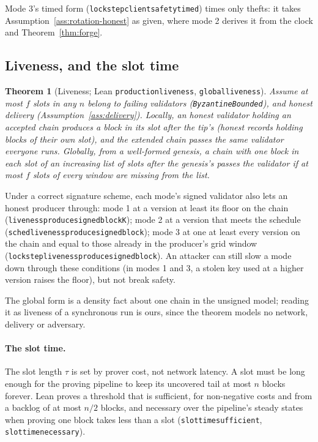 \documentclass[10pt]{article}
\newtheorem{theorem}{Theorem}
\DeclareRobustCommand{\code}[1]{{\renewcommand{\_}{\textunderscore\allowbreak}\texttt{#1}}}
\newcommand{\fmax}{\ensuremath{f}}
\begin{document}
Mode 3's timed form (\code{lockstep\_client\_safety\_timed}) times only
thefts: it takes Assumption~\ref{ass:rotation-honest} as given, where mode 2
derives it from the clock and Theorem~\ref{thm:forge}.

\subsection{Liveness, and the slot time}
\label{sec:liveness}

\begin{theorem}[Liveness; Lean \code{production\_liveness},
\code{global\_liveness}]\label{thm:live}
Assume at most $\fmax$ slots in any $n$ belong to failing validators
(\code{ByzantineBounded}), and honest delivery
(Assumption~\ref{ass:delivery}). Locally, an honest validator holding an
accepted chain produces a block in its slot after the tip's (honest
records holding blocks of their own slot), and the extended chain
passes the same validator everyone runs. Globally, from a well-formed
genesis, a chain with one block in each slot of an increasing list of
slots after the genesis's passes the validator if at most $\fmax$ slots of every window are missing
from the list.
\end{theorem}

Under a correct signature scheme, each mode's signed validator also lets
an honest producer through: mode 1 at a version at least its floor on the chain
(\code{liveness\_produce\_signed\_blockK}); mode 2 at a version that meets
the schedule (\code{sched\_liveness\_produce\_signed\_block}); mode 3 at
one at least every version on the chain and equal to those already in the
producer's grid window (\code{lockstep\_liveness\_produce\_signed\_block}). An attacker
can still slow a mode down through these conditions (in modes 1 and 3,
a stolen key used at a higher version raises the floor), but not break safety.

The global form is a density fact about one chain in the unsigned
model; reading it as liveness of a synchronous run is ours, since the
theorem models no network, delivery or adversary.

\paragraph{The slot time.} The slot length $\tau$ is set by prover cost,
not network latency. A slot must be long enough for the proving pipeline
to keep its uncovered tail at most $n$ blocks forever. Lean proves a
threshold that is sufficient, for non-negative costs and from a backlog
of at most $n/2$ blocks, and
necessary over the pipeline's steady states when proving one block takes
less than a slot (\code{slot\_time\_sufficient},
\code{slot\_time\_necessary}).
\end{document}
